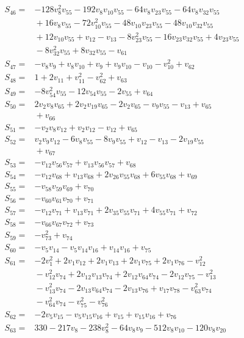 \documentclass[11pt]{article}
\begin{document}
\begin{align*}
S_{46}={}&-128v_{8}^{2}v_{55}-192v_{8}v_{10}v_{55}-64v_{8}v_{23}v_{55}-64v_{8}v_{32}v_{55}\\
&{}+16v_{8}v_{55}-72v_{10}^{2}v_{55}-48v_{10}v_{23}v_{55}-48v_{10}v_{32}v_{55}\\
&{}+12v_{10}v_{55}+v_{12}-v_{13}-8v_{23}^{2}v_{55}-16v_{23}v_{32}v_{55}+4v_{23}v_{55}\\
&{}-8v_{32}^{2}v_{55}+8v_{32}v_{55}-v_{61}\\
S_{47}={}&-v_{8}v_{9}+v_{8}v_{10}+v_{9}+v_{9}v_{10}-v_{10}-v_{10}^{2}+v_{62}\\
S_{48}={}&1+2v_{11}+v_{11}^{2}-v_{62}^{2}+v_{63}\\
S_{49}={}&-8v_{54}^{2}v_{55}-12v_{54}v_{55}-2v_{55}+v_{64}\\
S_{50}={}&2v_{2}v_{8}v_{65}+2v_{2}v_{19}v_{65}-2v_{2}v_{65}-v_{9}v_{55}-v_{13}+v_{65}\\
&{}+v_{66}\\
S_{51}={}&-v_{2}v_{8}v_{12}+v_{2}v_{12}-v_{12}+v_{65}\\
S_{52}={}&v_{2}v_{9}v_{12}-6v_{8}v_{55}-8v_{9}v_{55}+v_{12}-v_{13}-2v_{19}v_{55}\\
&{}+v_{67}\\
S_{53}={}&-v_{12}v_{56}v_{57}+v_{13}v_{56}v_{57}+v_{68}\\
S_{54}={}&-v_{12}v_{68}+v_{13}v_{68}+2v_{26}v_{55}v_{68}+6v_{55}v_{68}+v_{69}\\
S_{55}={}&-v_{58}v_{59}v_{69}+v_{70}\\
S_{56}={}&-v_{60}v_{61}v_{70}+v_{71}\\
S_{57}={}&-v_{12}v_{71}+v_{13}v_{71}+2v_{35}v_{55}v_{71}+4v_{55}v_{71}+v_{72}\\
S_{58}={}&-v_{66}v_{67}v_{72}+v_{73}\\
S_{59}={}&-v_{73}^{2}+v_{74}\\
S_{60}={}&-v_{5}v_{14}-v_{5}v_{14}v_{16}+v_{14}v_{16}+v_{75}\\
S_{61}={}&-2v_{1}^{2}+2v_{1}v_{12}+2v_{1}v_{13}+2v_{1}v_{75}+2v_{1}v_{76}-v_{12}^{2}\\
&{}-v_{12}^{2}v_{74}+2v_{12}v_{13}v_{74}+2v_{12}v_{64}v_{74}-2v_{12}v_{75}-v_{13}^{2}\\
&{}-v_{13}^{2}v_{74}-2v_{13}v_{64}v_{74}-2v_{13}v_{76}+v_{17}v_{78}-v_{63}^{2}v_{74}\\
&{}-v_{64}^{2}v_{74}-v_{75}^{2}-v_{76}^{2}\\
S_{62}={}&-2v_{5}v_{15}-v_{5}v_{15}v_{16}+v_{15}+v_{15}v_{16}+v_{76}\\
S_{63}={}&330-217v_{8}-238v_{8}^{2}-64v_{8}v_{9}-512v_{8}v_{10}-120v_{8}v_{20}\\

\end{align*}
\end{document}
